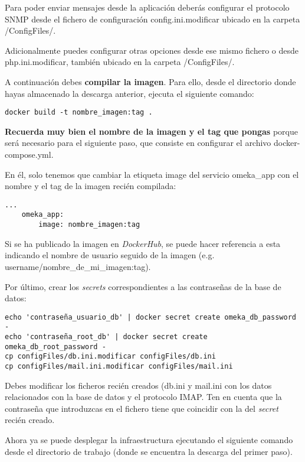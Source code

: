 Para poder enviar mensajes desde la aplicación deberás
configurar el protocolo SNMP desde el fichero de configuración {config.ini.modificar}
ubicado en la carpeta {/ConfigFiles/}.

Adicionalmente puedes configurar otras opciones desde ese mismo fichero o
desde {php.ini.modificar}, también ubicado en la carpeta {/ConfigFiles/}.

A continuación debes \textbf{compilar la imagen}. Para ello, desde el
directorio donde hayas almacenado la descarga anterior, ejecuta el
siguiente comando:

\begin{verbatim}
docker build -t nombre_imagen:tag .
\end{verbatim}

\textbf{Recuerda muy bien el nombre de la imagen y el tag que pongas}
porque será necesario para el siguiente paso, que consiste en configurar
el archivo {docker-compose.yml}.

En él, solo tenemos que cambiar la etiqueta {image} del servicio
{omeka\_app} con el nombre y el tag de la imagen recién compilada:

\begin{verbatim}
...
    omeka_app:
        image: nombre_imagen:tag
\end{verbatim} 

Si se ha publicado la imagen en \emph{DockerHub}, se puede hacer
referencia a esta indicando el nombre de usuario seguido de la imagen
(e.g. username/nombre\_de\_mi\_imagen:tag).

Por último, crear los \emph{secrets} correspondientes a las contraseñas
de la base de datos:

\begin{verbatim}
echo 'contraseña_usuario_db' | docker secret create omeka_db_password -
echo 'contraseña_root_db' | docker secret create omeka_db_root_password -
cp configFiles/db.ini.modificar configFiles/db.ini
cp configFiles/mail.ini.modificar configFiles/mail.ini
\end{verbatim} 

Debes modificar los ficheros recién creados ({db.ini} y {mail.ini} con los datos relacionados
con la base de datos y el protocolo IMAP. Ten en cuenta que la contraseña que introduzcas en el
fichero tiene que coincidir con la del \emph{secret} recién creado.

Ahora ya se puede desplegar la infraestructura ejecutando el siguiente
comando desde el directorio de trabajo (donde se encuentra la descarga
del primer paso).


